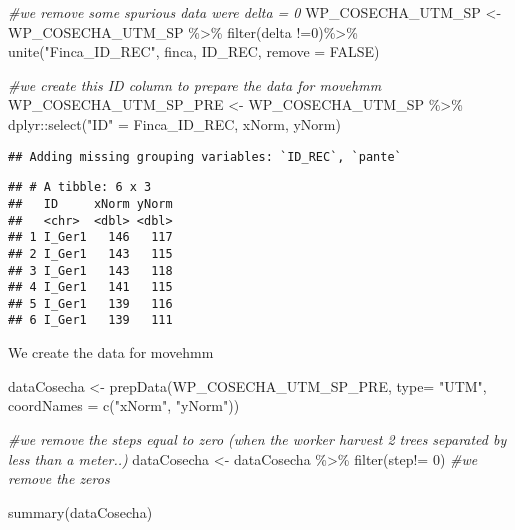 \documentclass[
]{article}
\newenvironment{Shaded}{\begin{snugshade}}{\end{snugshade}}
\newcommand{\AttributeTok}[1]{\textcolor[rgb]{0.77,0.63,0.00}{#1}}
\newcommand{\CommentTok}[1]{\textcolor[rgb]{0.56,0.35,0.01}{\textit{#1}}}
\newcommand{\ConstantTok}[1]{\textcolor[rgb]{0.00,0.00,0.00}{#1}}
\newcommand{\DecValTok}[1]{\textcolor[rgb]{0.00,0.00,0.81}{#1}}
\newcommand{\FunctionTok}[1]{\textcolor[rgb]{0.00,0.00,0.00}{#1}}
\newcommand{\NormalTok}[1]{#1}
\newcommand{\OtherTok}[1]{\textcolor[rgb]{0.56,0.35,0.01}{#1}}
\newcommand{\SpecialCharTok}[1]{\textcolor[rgb]{0.00,0.00,0.00}{#1}}
\newcommand{\StringTok}[1]{\textcolor[rgb]{0.31,0.60,0.02}{#1}}
\begin{document}
\begin{Shaded}
\begin{Highlighting}[]
\CommentTok{\#we remove some spurious data were delta = 0}
\NormalTok{WP\_COSECHA\_UTM\_SP }\OtherTok{\textless{}{-}}\NormalTok{ WP\_COSECHA\_UTM\_SP }\SpecialCharTok{\%\textgreater{}\%}
  \FunctionTok{filter}\NormalTok{(delta }\SpecialCharTok{!=}\DecValTok{0}\NormalTok{)}\SpecialCharTok{\%\textgreater{}\%}
  \FunctionTok{unite}\NormalTok{(}\StringTok{"Finca\_ID\_REC"}\NormalTok{, finca, ID\_REC, }\AttributeTok{remove =} \ConstantTok{FALSE}\NormalTok{)}

\CommentTok{\#we create this ID column to prepare the data for movehmm}
\NormalTok{WP\_COSECHA\_UTM\_SP\_PRE }\OtherTok{\textless{}{-}}\NormalTok{ WP\_COSECHA\_UTM\_SP }\SpecialCharTok{\%\textgreater{}\%}
\NormalTok{  dplyr}\SpecialCharTok{::}\FunctionTok{select}\NormalTok{(}\StringTok{"ID"} \OtherTok{=}\NormalTok{ Finca\_ID\_REC, xNorm, yNorm)}
\end{Highlighting}
\end{Shaded}

\begin{verbatim}
## Adding missing grouping variables: `ID_REC`, `pante`
\end{verbatim}

\begin{Shaded}
\end{Shaded}

\begin{verbatim}
## # A tibble: 6 x 3
##   ID     xNorm yNorm
##   <chr>  <dbl> <dbl>
## 1 I_Ger1   146   117
## 2 I_Ger1   143   115
## 3 I_Ger1   143   118
## 4 I_Ger1   141   115
## 5 I_Ger1   139   116
## 6 I_Ger1   139   111
\end{verbatim}

We create the data for movehmm

\begin{Shaded}
\begin{Highlighting}[]
\NormalTok{dataCosecha }\OtherTok{\textless{}{-}} \FunctionTok{prepData}\NormalTok{(WP\_COSECHA\_UTM\_SP\_PRE, }\AttributeTok{type=} \StringTok{"UTM"}\NormalTok{, }\AttributeTok{coordNames =} \FunctionTok{c}\NormalTok{(}\StringTok{"xNorm"}\NormalTok{, }\StringTok{"yNorm"}\NormalTok{))}

\CommentTok{\#we remove the steps equal to zero (when the worker harvest 2 trees separated by less than a meter..)}
\NormalTok{dataCosecha }\OtherTok{\textless{}{-}}\NormalTok{ dataCosecha }\SpecialCharTok{\%\textgreater{}\%} 
  \FunctionTok{filter}\NormalTok{(step}\SpecialCharTok{!=} \DecValTok{0}\NormalTok{)  }\CommentTok{\#we remove the zeros}

\FunctionTok{summary}\NormalTok{(dataCosecha)}
\end{Highlighting}
\end{Shaded}
\end{document}
